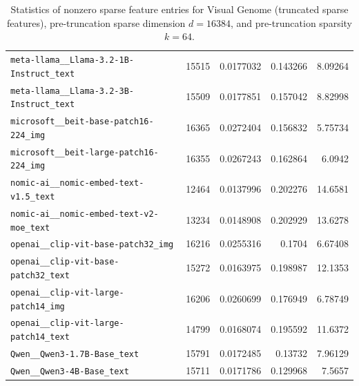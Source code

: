 \begin{table}[htbp]
{\begin{tabular}{lrrrr}
\texttt{meta-llama\_\_Llama-3.2-1B-Instruct\_text} & 15515 & 0.0177032 & 0.143266 & 8.09264 \\
\texttt{meta-llama\_\_Llama-3.2-3B-Instruct\_text} & 15509 & 0.0177851 & 0.157042 & 8.82998 \\
\texttt{microsoft\_\_beit-base-patch16-224\_img} & 16365 & 0.0272404 & 0.156832 & 5.75734 \\
\texttt{microsoft\_\_beit-large-patch16-224\_img} & 16355 & 0.0267243 & 0.162864 & 6.0942 \\
\texttt{nomic-ai\_\_nomic-embed-text-v1.5\_text} & 12464 & 0.0137996 & 0.202276 & 14.6581 \\
\texttt{nomic-ai\_\_nomic-embed-text-v2-moe\_text} & 13234 & 0.0148908 & 0.202929 & 13.6278 \\
\texttt{openai\_\_clip-vit-base-patch32\_img} & 16216 & 0.0255316 & 0.1704 & 6.67408 \\
\texttt{openai\_\_clip-vit-base-patch32\_text} & 15272 & 0.0163975 & 0.198987 & 12.1353 \\
\texttt{openai\_\_clip-vit-large-patch14\_img} & 16206 & 0.0260699 & 0.176949 & 6.78749 \\
\texttt{openai\_\_clip-vit-large-patch14\_text} & 14799 & 0.0168074 & 0.195592 & 11.6372 \\
\texttt{Qwen\_\_Qwen3-1.7B-Base\_text} & 15791 & 0.0172485 & 0.13732 & 7.96129 \\
\texttt{Qwen\_\_Qwen3-4B-Base\_text} & 15711 & 0.0171786 & 0.129968 & 7.5657 \\
\bottomrule
\end{tabular}
}%
\caption{Statistics of nonzero sparse feature entries for Visual Genome (truncated sparse features), pre-truncation sparse dimension $d=16384$, and pre-truncation sparsity $k=64$.}
\label{tab:sparse-feature-entries-visual-genome-truncated-d16384-k64}
\end{table}
